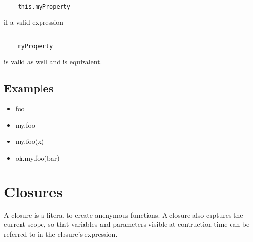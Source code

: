 \documentclass[a4paper,10pt]{scrreprt}
\newlength{\itemindentlen}
\begin{document}
\begin{lstlisting}

	this.myProperty

\end{lstlisting}

if a valid expression

\begin{lstlisting}

	myProperty

\end{lstlisting}

is valid as well and is equivalent. 




\subsection{ Examples }


\setlength{\itemindentlen}{\textwidth}
\begin{itemize}
\addtolength{\itemindentlen}{-2em}

\item \begin{minipage}[t]{\itemindentlen}
foo
\end{minipage}

\item \begin{minipage}[t]{\itemindentlen}
my.foo
\end{minipage}

\item \begin{minipage}[t]{\itemindentlen}
my.foo(x)
\end{minipage}

\item \begin{minipage}[t]{\itemindentlen}
oh.my.foo(bar)
\end{minipage}

\end{itemize}
\addtolength{\itemindentlen}{2em}







\section{Closures}
\label{Closures}

A closure is a literal to create anonymous functions. A closure also captures the current scope, so that variables and parameters visible at contruction time can be referred to in the
closure's expression. 
\end{document}

